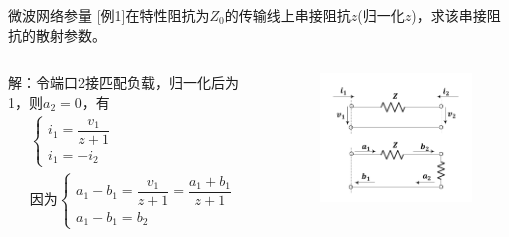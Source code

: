 \begin{frame}{微波网络参量}
    [例1]\quad 在特性阻抗为$Z_0$的传输线上串接阻抗$z$(归一化$z$)，求该串接阻抗的散射参数。\\
    \begin{columns}
        \begin{column}{0.5\linewidth}
            解：令端口2接匹配负载，归一化后为1，则$a_2=0$，有
            \begin{gather*}
                \begin{cases}
                    i_1=\dfrac{v_1}{z+1} \\
                    i_1=-i_2
                \end{cases}\\
                因为
                \begin{cases}
                    a_1-b_1=\dfrac{v_1}{z+1}=\dfrac{a_1+b_1}{z+1} \\
                    a_1-b_1=b_2
                \end{cases}
            \end{gather*}
        \end{column}
        \begin{column}{0.5\linewidth}
            \begin{figure}
                \includegraphics[width=6cm]{Cha5//fig5-14.pdf}
            \end{figure}
        \end{column}
    \end{columns}
\end{frame}

